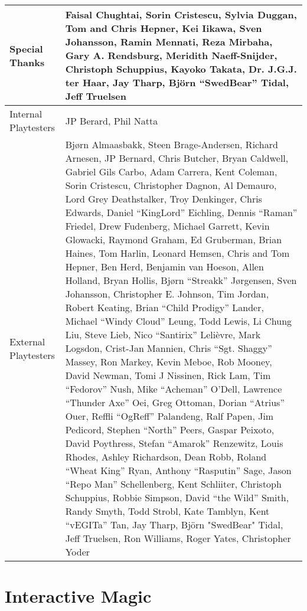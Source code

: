 \begin{center}
\begin{tabular}{|p{1in}|p{3in}|}
	\hline
Special Thanks	& Faisal Chughtai, Sorin Cristescu, Sylvia Duggan, Tom and Chris Hepner, Kei Iikawa, Sven Johansson, Ramin Mennati, Reza Mirbaha, Gary A. Rendsburg, Meridith Naeff-Snijder, Christoph Schuppius, Kayoko Takata, Dr. J.G.J. ter Haar, Jay Tharp, Björn “SwedBear” Tidal, Jeff Truelsen \\ \hline
Internal Playtesters	& JP Berard, Phil Natta \\ \hline
External Playtesters	& Bjørn Almaasbakk, Steen Brage-Andersen, Richard Arnesen, JP Bernard, Chris Butcher, Bryan Caldwell, Gabriel Gils Carbo, Adam Carrera, Kent Coleman, Sorin Cristescu, Christopher Dagnon, Al Demauro, Lord Grey Deathstalker, Troy Denkinger, Chris Edwards, Daniel “KingLord” Eichling, Dennis “Raman” Friedel, Drew Fudenberg, Michael Garrett, Kevin Glowacki, Raymond Graham, Ed Gruberman, Brian Haines, Tom Harlin, Leonard Hemsen, Chris and Tom Hepner, Ben Herd, Benjamin van Hoeson, Allen Holland, Bryan Hollis, Bjørn “Streakk” Jørgensen, Sven Johansson, Christopher E. Johnson, Tim Jordan, Robert Keating, Brian “Child Prodigy” Lander, Michael “Windy Cloud” Leung, Todd Lewis, Li Chung Liu, Steve Lieb, Nico “Santirix” Lelièvre, Mark Logsdon, Crist-Jan Mannien, Chris “Sgt. Shaggy” Massey, Ron Markey, Kevin Meboe, Rob Mooney, David Newman, Tomi J Nissinen, Rick Lam, Tim “Fedorov” Nush, Mike “Acheman” O'Dell, Lawrence “Thunder Axe” Oei, Greg Ottoman, Dorian “Atrius” Ouer, Reffli “OgReff” Palandeng, Ralf Papen, Jim Pedicord, Stephen “North” Peers, Gaspar Peixoto, David Poythress, Stefan “Amarok” Renzewitz, Louis Rhodes, Ashley Richardson, Dean Robb, Roland “Wheat King” Ryan, Anthony “Rasputin” Sage, Jason “Repo Man” Schellenberg, Kent Schliiter, Christoph Schuppius, Robbie Simpson, David “the Wild” Smith, Randy Smyth, Todd Strobl, Kate Tamblyn, Kent “vEGITa” Tan, Jay Tharp, Björn "SwedBear" Tidal, Jeff Truelsen, Ron Williams, Roger Yates, Christopher Yoder \\ \hline
\end{tabular}
\end{center}

\clearpage

\section{Interactive Magic}

